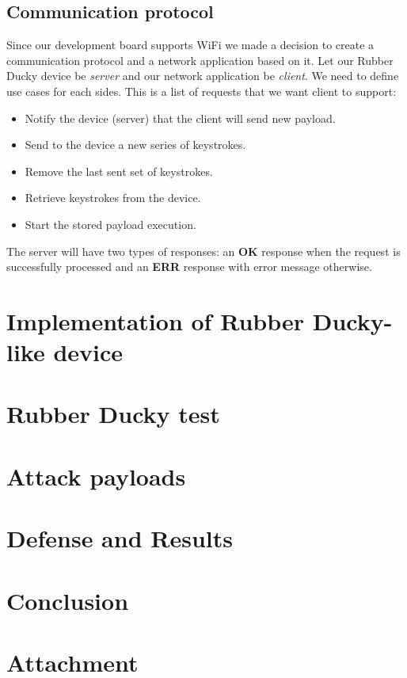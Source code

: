 \section{Communication protocol}
Since our development board supports WiFi we made a decision to create a communication protocol and a network application based on it. Let our Rubber Ducky device be \emph{server} and our network application be \emph{client}. We need to define use cases for each sides. This is a list of requests that we want client to support:
\begin{itemize}
    \item Notify the device (server) that the client will send new payload.
    \item Send to the device a new series of keystrokes.
    \item Remove the last sent set of keystrokes.
    \item Retrieve keystrokes from the device.
    \item Start the stored payload execution.
\end{itemize}

The server will have two types of responses: an \textbf{OK} response when the request is successfully processed and an \textbf{ERR} response with error message otherwise.


\chapter{Implementation of Rubber Ducky-like device}
\label{implementation}


\chapter{Rubber Ducky test}
\label{practicalTest}

\chapter{Attack payloads}
\label{attackPayloads}

\chapter{Defense and Results}
\label{defense}

\chapter{Conclusion}
\label{conclusion}

\chapter{Attachment}
\label{attachment}
